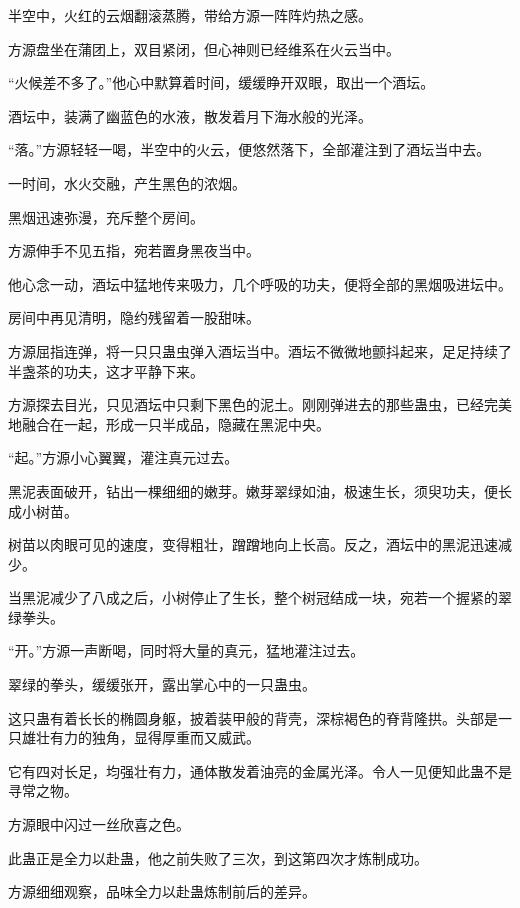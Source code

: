 
\begin{this_body}

半空中，火红的云烟翻滚蒸腾，带给方源一阵阵灼热之感。

方源盘坐在蒲团上，双目紧闭，但心神则已经维系在火云当中。

“火候差不多了。”他心中默算着时间，缓缓睁开双眼，取出一个酒坛。

酒坛中，装满了幽蓝色的水液，散发着月下海水般的光泽。

“落。”方源轻轻一喝，半空中的火云，便悠然落下，全部灌注到了酒坛当中去。

一时间，水火交融，产生黑色的浓烟。

黑烟迅速弥漫，充斥整个房间。

方源伸手不见五指，宛若置身黑夜当中。

他心念一动，酒坛中猛地传来吸力，几个呼吸的功夫，便将全部的黑烟吸进坛中。

房间中再见清明，隐约残留着一股甜味。

方源屈指连弹，将一只只蛊虫弹入酒坛当中。酒坛不微微地颤抖起来，足足持续了半盏茶的功夫，这才平静下来。

方源探去目光，只见酒坛中只剩下黑色的泥土。刚刚弹进去的那些蛊虫，已经完美地融合在一起，形成一只半成品，隐藏在黑泥中央。

“起。”方源小心翼翼，灌注真元过去。

黑泥表面破开，钻出一棵细细的嫩芽。嫩芽翠绿如油，极速生长，须臾功夫，便长成小树苗。

树苗以肉眼可见的速度，变得粗壮，蹭蹭地向上长高。反之，酒坛中的黑泥迅速减少。

当黑泥减少了八成之后，小树停止了生长，整个树冠结成一块，宛若一个握紧的翠绿拳头。

“开。”方源一声断喝，同时将大量的真元，猛地灌注过去。

翠绿的拳头，缓缓张开，露出掌心中的一只蛊虫。

这只蛊有着长长的椭圆身躯，披着装甲般的背壳，深棕褐色的脊背隆拱。头部是一只雄壮有力的独角，显得厚重而又威武。

它有四对长足，均强壮有力，通体散发着油亮的金属光泽。令人一见便知此蛊不是寻常之物。

方源眼中闪过一丝欣喜之色。

此蛊正是全力以赴蛊，他之前失败了三次，到这第四次才炼制成功。

方源细细观察，品味全力以赴蛊炼制前后的差异。


\end{this_body}
